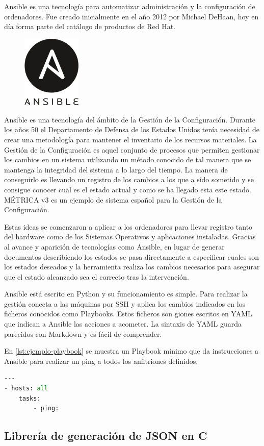 Ansible es una tecnología para automatizar administración y la configuración de ordenadores. Fue creado inicialmente en el año 2012 por Michael DeHaan, hoy en día forma parte del catálogo de productos de Red Hat.

\begin{figure}
    \centering
    \includegraphics[width=0.25\textwidth]{imaxes/e-fundamentos-tecnologicos/logo-ansible.png}
\end{figure}

Ansible es una tecnología del ámbito de la Gestión de la Configuración. Durante los años 50 el Departamento de Defensa de los Estados Unidos tenía necesidad de crear una metodología para mantener el inventario de los recursos materiales. La Gestión de la Configuración es aquel conjunto de procesos que permiten gestionar los cambios en un sistema utilizando un método conocido de tal manera que se mantenga la integridad del sistema a lo largo del tiempo. La manera de conseguirlo es llevando un registro de los cambios a los que a sido sometido y se consigue conocer cual es el estado actual y como se ha llegado esta este estado. MÉTRICA v3 es un ejemplo de sistema español para la Gestión de la Configuración.

Estas ideas se comenzaron a aplicar a los ordenadores para llevar registro tanto del hardware como de los Sistemas Operativos y aplicaciones instaladas. Gracias al avance y aparición de tecnologías como Ansible, en lugar de generar documentos describiendo los estados se pasa directamente a especificar cuales son los estados deseados y la herramienta realiza los cambios necesarios para asegurar que el estado alcanzado sea el correcto tras la intervención.

Ansible está escrito en Python y su funcionamiento es simple. Para realizar la gestión conecta a las máquinas por SSH y aplica los cambios indicados en los ficheros conocidos como Playbooks. Estos ficheros son giones escritos en YAML que indican a Ansible las acciones a acometer. La sintaxis de YAML guarda parecidos con Markdown y es fácil de comprender.

En \ref{lst:ejemplo-playbook} se muestra un Playbook mínimo que da instrucciones a Ansible para realizar un ping a todos los anfitriones definidos.

\begin{lstlisting}[language=Python,caption={Ejemplo mínimo de Playbook},label=lst:ejemplo-playbook]
---
- hosts: all
    tasks:
        - ping:
\end{lstlisting}

\subsection{Librería de generación de JSON en C}